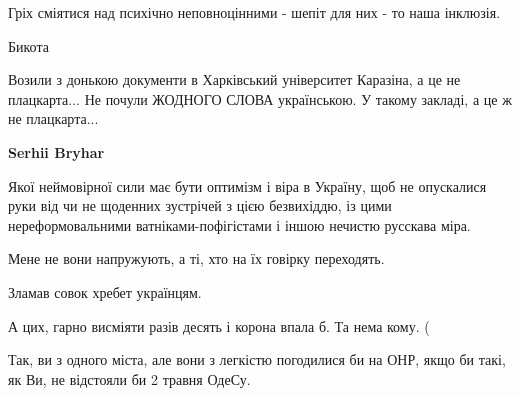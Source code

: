 \begin{itemize}
Гріх сміятися над психічно неповноцінними - шепіт для них - то наша інклюзія.

 
Бикота

 

Возили з донькою документи в Харківський університет Каразіна, а це не
плацкарта... Не почули ЖОДНОГО СЛОВА українською. У такому закладі, а це ж не
плацкарта...


 
\textbf{Serhii Bryhar} 

Якої неймовірної сили має бути оптимізм і віра в Україну, щоб не опускалися
руки від чи не щоденних зустрічей з цією безвихіддю, із цими нереформовальними
ватніками-пофігістами і іншою нечистю русскава міра.


 

Мене не вони напружують, а ті, хто на їх говірку переходять.

Зламав совок хребет українцям.

А цих, гарно висміяти разів десять і корона впала б. Та нема кому. (

 
Так, ви з одного міста, але вони з легкістю погодилися би на ОНР, якщо би такі,
як Ви, не відстояли би 2 травня ОдеСу.


\end{itemize}
